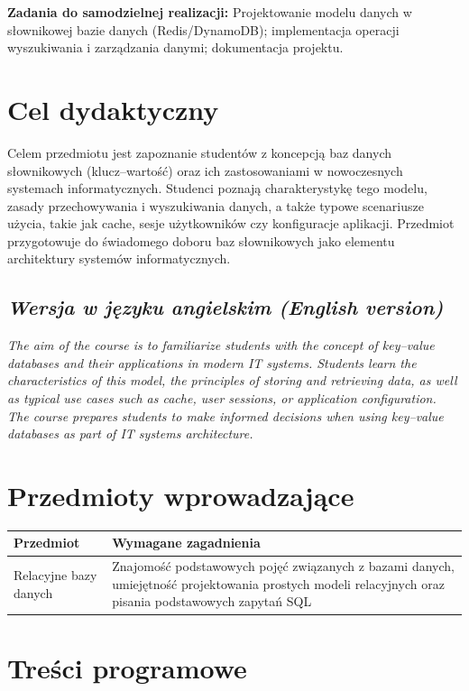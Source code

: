 \documentclass[12pt, a4paper]{article}
\begin{document}
\vspace{4pt}
\noindent\textbf{Zadania do samodzielnej realizacji:} Projektowanie modelu danych w słownikowej bazie danych (Redis/DynamoDB); implementacja operacji wyszukiwania i zarządzania danymi; dokumentacja projektu.

\section{Cel dydaktyczny}

Celem przedmiotu jest zapoznanie studentów z koncepcją baz danych słownikowych (klucz–wartość) oraz ich zastosowaniami w nowoczesnych systemach informatycznych. Studenci poznają charakterystykę tego modelu, zasady przechowywania i wyszukiwania danych, a także typowe scenariusze użycia, takie jak cache, sesje użytkowników czy konfiguracje aplikacji. Przedmiot przygotowuje do świadomego doboru baz słownikowych jako elementu architektury systemów informatycznych.

\subsection*{\textit{Wersja w języku angielskim (English version)}}

\textit{The aim of the course is to familiarize students with the concept of key–value databases and their applications in modern IT systems. Students learn the characteristics of this model, the principles of storing and retrieving data, as well as typical use cases such as cache, user sessions, or application configuration. The course prepares students to make informed decisions when using key–value databases as part of IT systems architecture.}


\section{Przedmioty wprowadzające}

\begin{tabularx}{\textwidth}{lX}
  \hline
  \textbf{Przedmiot} & \textbf{Wymagane zagadnienia} \\
  \hline
  Relacyjne bazy danych & Znajomość podstawowych pojęć związanych z bazami danych, umiejętność projektowania prostych modeli relacyjnych oraz pisania podstawowych zapytań SQL \\
  \hline
\end{tabularx}

\section{Treści programowe}
\end{document}
